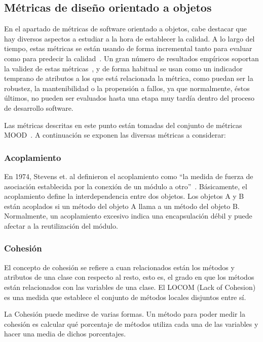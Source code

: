 \documentclass[11pt]{article}
\begin{document}
\subsection{Métricas de diseño orientado a objetos}

En el apartado de métricas de software orientado a objetos, cabe destacar que hay diversos aspectos a estudiar a la hora de establecer la calidad. A lo largo del tiempo, estas métricas se están usando de forma incremental tanto para evaluar como para predecir la calidad~\cite{oometrics:introduction}. Un gran número de resultados empíricos soportan la validez de estas métricas~\cite{validation:oodesignasqualityindicators}, y de forma habitual se usan como un indicador temprano de atributos a los que está relacionada la métrica, como puedan ser la robustez, la mantenibilidad o la propensión a fallos, ya que normalmente, éstos últimos, no pueden ser evaluados hasta una etapa muy tardía dentro del proceso de desarrollo software.

Las métricas descritas en este punto están tomadas del conjunto de métricas MOOD~\cite{mood:metricsset}. A continuación se exponen las diversas métricas a considerar:

\subsubsection{Acoplamiento}
En 1974, Stevens et. al definieron el acoplamiento como ``la medida de fuerza de asociación establecida por la conexión de un módulo a otro''~\cite{structuredesign:coupling}. Básicamente, el acoplamiento define la interdependencia entre dos objetos. Los objetos A y B están acoplados si un método del objeto A llama a un método del objeto B. Normalmente, un acoplamiento excesivo indica una encapsulación débil y puede afectar a la reutilización del módulo.

\subsubsection{Cohesión}
El concepto de cohesión se refiere a cuan relacionados están los métodos y atributos de una clase con respecto al resto, esto es, el grado en que los métodos están relacionados con las variables de una clase. El LOCOM (Lack of Cohesion) es una medida que establece el conjunto de métodos locales disjuntos entre sí.

La Cohesión puede medirse de varias formas. Un método para poder medir la cohesión es calcular qué porcentaje de métodos utiliza cada una de las variables y hacer una media de dichos porcentajes.
\end{document}
